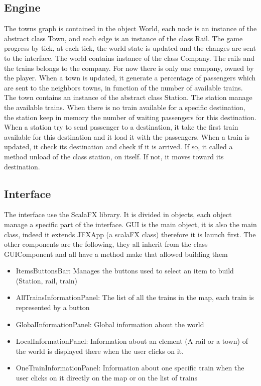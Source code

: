 \documentclass{article}
\begin{document}
\subsection{Engine}
The towns graph is contained in the object World, each node is an instance of the abstract class Town, and each edge is an instance of the class Rail.
The game progress by tick, at each tick, the world state is updated and the changes are sent to the interface.
The world contains instance of the class Company.
The rails and the trains belongs to the company. 
For now there is only one company, owned by the player.
When a town is updated, it generate a percentage of passengers which are sent to the neighbors towns, in function of the number of available trains.
The town contains an instance of the abstract class Station. 
The station manage the available trains. 
When there is no train available for a specific destination, the station keep in memory the number of waiting passengers for this destination. 
When a station try to send passenger to a destination, it take the first train available for this destination and it load it with the passengers.
When a train is updated, it check its destination and check if it is arrived. 
If so, it called a method unload of the class station, on itself.
If not, it moves toward its destination.

\subsection{Interface}
The interface use the ScalaFX library.
It is divided in objects, each object manage a specific part of the interface.
GUI is the main object, it is also the main class, indeed it extends JFXApp (a scalaFX class) therefore it is launch first.
The other components are the following, they all inherit from the class GUIComponent and all have a method make that allowed building them
\begin{itemize}
	\item ItemsButtonsBar: Manages the buttons used to select an item to build (Station, rail, train)
	\item AllTrainsInformationPanel: The list of all the trains in the map, each train is represented by a button
	\item GlobalInformationPanel: Global information about the world
	\item LocalInformationPanel: Information about an element (A rail or a town) of the world is displayed there when the user clicks on it.
	\item OneTrainInformationPanel: Information about one specific train when the user clicks on it directly on the map or on the list of trains
\end{itemize}
\end{document}
